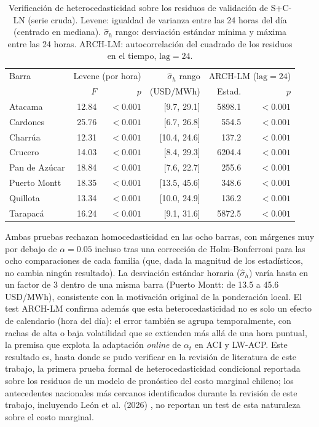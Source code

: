 \begin{table}[htbp]
    \centering
    \small
    \begin{tabular}{lrrrrr}
        \toprule
        Barra & \multicolumn{2}{c}{Levene (por hora)} & $\hat{\sigma}_h$ rango & \multicolumn{2}{c}{ARCH-LM ($\text{lag}=24$)} \\
         & $F$ & $p$ & (USD/MWh) & Estad. & $p$ \\
        \midrule
        Atacama       & 12.84 & $<0.001$ & [9.7, 29.1]  & 5898.1 & $<0.001$ \\
        Cardones      & 25.76 & $<0.001$ & [6.7, 26.8]  & 554.5  & $<0.001$ \\
        Charrúa       & 12.31 & $<0.001$ & [10.4, 24.6] & 137.2  & $<0.001$ \\
        Crucero       & 14.03 & $<0.001$ & [8.4, 29.3]  & 6204.4 & $<0.001$ \\
        Pan de Azúcar & 18.84 & $<0.001$ & [7.6, 22.7]  & 255.6  & $<0.001$ \\
        Puerto Montt  & 18.35 & $<0.001$ & [13.5, 45.6] & 348.6  & $<0.001$ \\
        Quillota      & 13.34 & $<0.001$ & [10.0, 24.9] & 136.2  & $<0.001$ \\
        Tarapacá      & 16.24 & $<0.001$ & [9.1, 31.6]  & 5872.5 & $<0.001$ \\
        \bottomrule
    \end{tabular}
    \vspace{0.2cm}
    \caption{Verificación de heterocedasticidad sobre los residuos de validación de S+C-LN (serie cruda). Levene: igualdad de varianza entre las 24 horas del día (centrado en mediana). $\hat{\sigma}_h$ rango: desviación estándar mínima y máxima entre las 24 horas. ARCH-LM: autocorrelación del cuadrado de los residuos en el tiempo, $\text{lag}=24$.}
    \label{tab:heterocedasticidad}
\end{table}

Ambas pruebas rechazan homocedasticidad en las ocho barras, con márgenes muy por debajo de $\alpha=0.05$ incluso tras una corrección de Holm-Bonferroni para las ocho comparaciones de cada familia (que, dada la magnitud de los estadísticos, no cambia ningún resultado). La desviación estándar horaria ($\hat{\sigma}_h$) varía hasta en un factor de 3 dentro de una misma barra (Puerto Montt: de 13.5 a 45.6\,USD/MWh), consistente con la motivación original de la ponderación local. El test ARCH-LM confirma además que esta heterocedasticidad no es solo un efecto de calendario (hora del día): el error también se agrupa temporalmente, con rachas de alta o baja volatilidad que se extienden más allá de una hora puntual, la premisa que explota la adaptación \textit{online} de $\alpha_t$ en ACI y LW-ACP. Este resultado es, hasta donde se pudo verificar en la revisión de literatura de este trabajo, la primera prueba formal de heterocedasticidad condicional reportada sobre los residuos de un modelo de pronóstico del costo marginal chileno; los antecedentes nacionales más cercanos identificados durante la revisión de este trabajo, incluyendo León et al. (2026) \cite{LeonSMPChile}, no reportan un test de esta naturaleza sobre el costo marginal.


